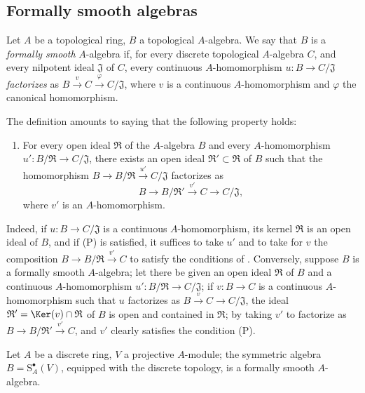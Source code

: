\subsection{Formally smooth algebras}
\label{subsection:0.19.3}

\begin{definition}[19.3.1]
\label{0.19.3.1}
Let $A$ be a topological ring, $B$ a topological $A$-algebra.
We say that $B$ is a \emph{formally smooth} $A$-algebra if, for every discrete topological $A$-algebra $C$, and every nilpotent ideal $\mathfrak{J}$ of $C$, every continuous $A$-homomorphism $u:B\to C/\mathfrak{J}$ \emph{factorizes} as $B\xrightarrow{v}C\xrightarrow{\varphi}C/\mathfrak{J}$, where $v$ is a continuous $A$-homomorphism and $\varphi$ the canonical homomorphism.
\end{definition}

The definition  amounts to saying that the following property holds:
\begin{enumerate}
  \item[(P)] For every open ideal $\mathfrak{R}$ of the $A$-algebra $B$ and every $A$-homomorphism $u':B/\mathfrak{R}\to C/\mathfrak{J}$, there exists an open ideal $\mathfrak{R}'\subset\mathfrak{R}$ of $B$ such that the homomorphism
  $B\to B/\mathfrak{R}\xrightarrow{u'}C/\mathfrak{J}$ factorizes as
  \[
    B\to B/\mathfrak{R}'\xrightarrow{v'}C\to C/\mathfrak{J},
  \]
  where $v'$ is an $A$-homomorphism.
\end{enumerate}

Indeed, if $u:B\to C/\mathfrak{J}$ is a continuous $A$-homomorphism, its kernel $\mathfrak{R}$ is an open ideal of $B$, and if (P) is satisfied, it suffices to take $u'$ and to take for $v$ the composition $B\to B/\mathfrak{R}\xrightarrow{v'}C$ to satisfy the conditions of .
Conversely, suppose $B$ is a formally smooth $A$-algebra;
let there be given an open ideal $\mathfrak{R}$ of $B$ and a continuous $A$-homomorphism $u':B/\mathfrak{R}\to C/\mathfrak{J}$;
if $v:B\to C$ is a continuous $A$-homomorphism such that $u$ factorizes as $B\xrightarrow{v}C\to C/\mathfrak{J}$, the ideal $\mathfrak{R}'=\Ker(v)\cap\mathfrak{R}$ of $B$ is open and contained in $\mathfrak{R}$;
by taking $v'$ to factorize as $B\to B/\mathfrak{R}'\xrightarrow{v'}C$, and $v'$ clearly satisfies the condition (P).

\begin{proposition}[19.3.2]
\label{0.19.3.2}
Let $A$ be a discrete ring, $V$ a projective $A$-module;
the symmetric algebra $B=\mathrm{S}_A^\bullet(V)$, equipped with the discrete topology, is a formally smooth $A$-algebra.
\end{proposition}

